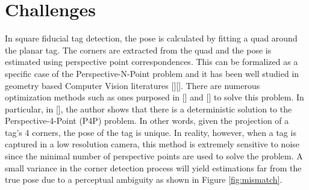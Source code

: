 \section{Challenges}
\label{sec:problem}
In square fiducial tag detection, the pose is calculated by fitting a quad around the planar tag. The corners are extracted from the quad and the pose is estimated using perspective point correspondences. This can be formalized as a specific case of the Perspective-N-Point problem and it has been well studied in geometry based Computer Vision literatures [][]. There are numerous optimization methods such as ones purposed in [] and [] to solve this problem. In particular, in [], the author shows that there is a deterministic solution to the Perspective-4-Point (P4P) problem. In other words, given the projection of a tag's 4 corners, the pose of the tag is unique. In reality, however, when a tag is captured in a low resolution camera, this method is extremely sensitive to noise since the minimal number of perspective points are used to solve the problem. A small variance in the corner detection process will yield estimations far from the true pose due to a perceptual ambiguity  as shown in Figure \ref{fig:mismatch}. 

